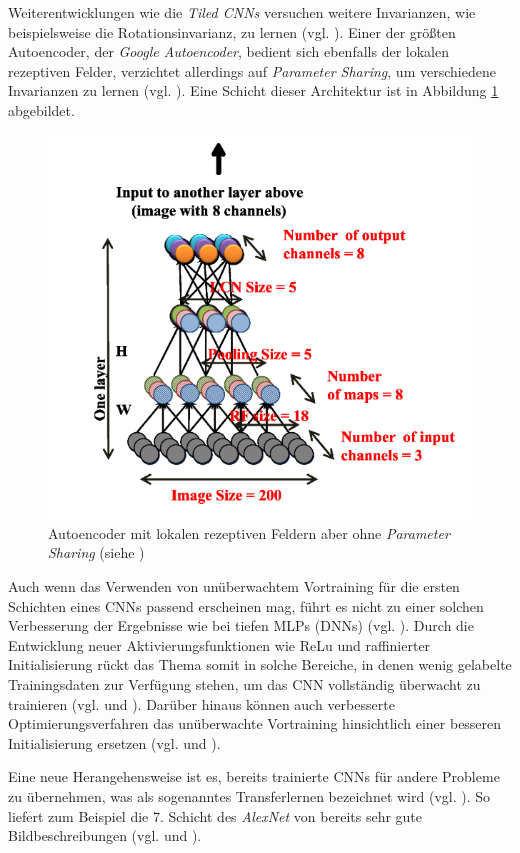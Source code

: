 Weiterentwicklungen wie die \textit{Tiled CNNs} versuchen weitere Invarianzen, wie beispielsweise die Rotationsinvarianz, zu lernen (vgl. \cite{Quoc2010}).
Einer der größten Autoencoder, der \textit{Google Autoencoder}, bedient sich ebenfalls der lokalen rezeptiven Felder, verzichtet allerdings auf \textit{Parameter Sharing}, um verschiedene Invarianzen zu lernen (vgl. \cite{LeRanzato2012}). Eine Schicht dieser Architektur ist in Abbildung \ref{fig:4_ranzato} abgebildet.

\begin{figure}
\centering
\includegraphics[width=0.5\linewidth]{images/4_ranzato}
\caption[]{Autoencoder mit lokalen rezeptiven Feldern aber ohne \textit{Parameter Sharing} (siehe \cite{LeRanzato2012})}
\label{fig:4_ranzato}
\end{figure}


Auch wenn das Verwenden von un\-über\-wach\-tem Vortraining für die ersten Schichten eines CNNs passend erscheinen mag, führt es nicht zu einer solchen Verbesserung der Ergebnisse wie bei tiefen MLPs (DNNs) (vgl. \cite{Hamid2013}). 
Durch die Entwicklung neuer Aktivierungsfunktionen wie ReLu und raffinierter Initialisierung rückt das Thema somit in solche Bereiche, in denen wenig gelabelte Trainingsdaten zur Verfügung stehen, um das CNN vollständig überwacht zu trainieren (vgl. \cite{Masci2011} und \cite{LeRanzato2012}). Darüber hinaus können auch verbesserte Optimierungsverfahren das un\-über\-wach\-te Vortraining hinsichtlich einer besseren Initialisierung ersetzen (vgl. \cite{Martens2010} und \cite{Sutskever2013}). 

Eine neue Herangehensweise ist es, bereits trainierte CNNs für andere Probleme zu übernehmen, was als sogenanntes Transferlernen bezeichnet wird (vgl. \cite{Wagner2013}). So liefert zum Beispiel die 7. Schicht des \textit{AlexNet} von \cite{Krizhevsky2012} bereits sehr gute Bildbeschreibungen (vgl. \cite{Bell2015} und \cite{Kaparthy2014}).


